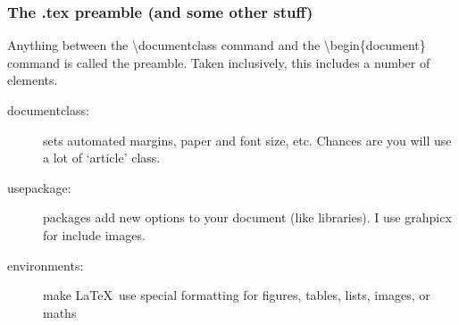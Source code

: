 \documentclass{beamer}
\begin{document}
\begin{frame}
	\frametitle{The .tex preamble (and some other stuff)}
	
	Anything between the \textbackslash documentclass command and the \textbackslash begin\{document\} command is called the preamble. Taken  inclusively, this includes a number of elements.
	
	\begin{description}
		\item[documentclass:] sets automated margins, paper and font size, etc. Chances are you will use a lot of `article' class.
		\item[usepackage:] packages add new options to your document (like libraries). I use grahpicx for include images.
		\item[environments:] make \LaTeX\ use special formatting for figures, tables, lists, images, or maths
	\end{description}
\end{frame}
\end{document}
